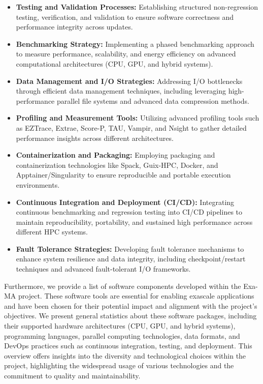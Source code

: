 \begin{itemize}
    \item \textbf{Testing and Validation Processes:} Establishing structured non-regression testing, verification, and validation to ensure software correctness and performance integrity across updates.
    \item \textbf{Benchmarking Strategy:} Implementing a phased benchmarking approach to measure performance, scalability, and energy efficiency on advanced computational architectures (CPU, GPU, and hybrid systems).
    \item \textbf{Data Management and I/O Strategies:} Addressing I/O bottlenecks through efficient data management techniques, including leveraging high-performance parallel file systems and advanced data compression methods.
    \item \textbf{Profiling and Measurement Tools:} Utilizing advanced profiling tools such as EZTrace, Extrae, Score-P, TAU, Vampir, and Nsight to gather detailed performance insights across different architectures.
    \item \textbf{Containerization and Packaging:} Employing packaging and containerization technologies like Spack, Guix-HPC, Docker, and Apptainer/Singularity to ensure reproducible and portable execution environments.
    \item \textbf{Continuous Integration and Deployment (CI/CD):} Integrating continuous benchmarking and regression testing into CI/CD pipelines to maintain reproducibility, portability, and sustained high performance across different HPC systems.
    \item \textbf{Fault Tolerance Strategies:} Developing fault tolerance mechanisms to enhance system resilience and data integrity, including checkpoint/restart techniques and advanced fault-tolerant I/O frameworks.
\end{itemize}

Furthermore, we provide a  list of software components developed within the Exa-MA project. These software tools are essential for enabling exascale applications and have been chosen for their potential impact and alignment with the project's objectives. We present general statistics about these software packages, including their supported hardware architectures (CPU, GPU, and hybrid systems), programming languages, parallel computing technologies, data formats, and DevOps practices such as continuous integration, testing, and deployment. This overview offers insights into the diversity and technological choices within the project, highlighting the widespread usage of various technologies and the commitment to quality and maintainability.

